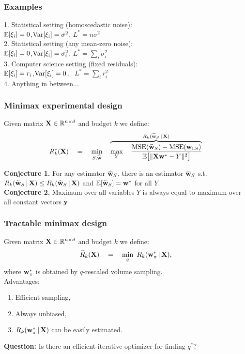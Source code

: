 \documentclass{beamer}
\begin{document}
\begin{frame}
  \frametitle{Examples}
  1. Statistical setting (homoscedastic noise):\\
  $\mathbb E[\xi_i]=0$,\quad$\mathrm{Var}[\xi_i]=\sigma^2$,\qquad
$L^* = n\sigma^2$\\[6mm]
  2. Statistical setting (any mean-zero noise):\\
  $\mathbb E[\xi_i]=0$,\quad$\mathrm{Var}[\xi_i] = \sigma_i^2$,\qquad
  $L^*=\sum_i\sigma_i^2$ \\[6mm]
  3. Computer science setting (fixed residuals):\\
$\mathbb E[\xi_i]=r_i$,\quad \!$\mathrm{Var}[\xi_i] = 0$,\qquad
\ $L^*=\sum_ir_i^2$\\[6mm]
4. Anything in between...
\end{frame}

\begin{frame}
  \frametitle{Minimax experimental design}
  Given matrix $\mathbf X\in\mathbb R^{n\times d}$ and budget $k$ we define: 
  \begin{align*}
R_k^*(\mathbf X)\quad =\quad \min_{S,\widehat{\mathbf w}}\quad\overbrace{\max_{Y}\quad
    \frac{\text{MSE}(\widehat{\mathbf w}_S)-\text{MSE}(\mathbf w_{\mathrm{LS}})}
    {  \mathbb E\big[\|\mathbf X\mathbf w^*- Y\|^2\big]}}^{R_k(\widehat{\mathbf w}_S\,|\,\mathbf X)}
  \end{align*}
  \vspace{3mm}
  
  \textbf{Conjecture 1.} For any estimator $\widehat{\mathbf w}_S$, there is an
 estimator $\widetilde{\mathbf w}_S$ s.t.~$R_k(\widetilde{\mathbf w}_S\,|\,\mathbf X)\leq
 R_k(\widehat{\mathbf w}_S\,|\,\mathbf X)$ and $\mathbb E[\widetilde{\mathbf w}_S]=\mathbf w^*$ for all $Y$.\\[5mm] 
  \textbf{Conjecture 2.} Maximum over all
  variables $Y$ is always equal to maximum over all constant vectors $\mathbf y$
\end{frame}

\begin{frame}
  \frametitle{Tractable minimax design}
    Given matrix $\mathbf X\in\mathbb R^{n\times d}$ and budget $k$ we
    define:
    \begin{align*}
      \widehat{R}_k(\mathbf X)\quad =\quad \min_{q}\ R_k(\mathbf w_\pi^*\,|\,\mathbf X),
    \end{align*}
    where $\mathbf w_\pi^*$ is obtained by $q$-rescaled volume sampling.\\[5mm]
    Advantages:
    \begin{enumerate}
    \item Efficient sampling,
    \item Always unbiased,
    \item $R_k(\mathbf w_\pi^*\,|\,\mathbf X)$ can be easily estimated.
    \end{enumerate}
    \vspace{3mm}
    
    \textbf{Question:} Is there an efficient iterative
   optimizer for finding $q^*$?
\end{frame}
\end{document}
